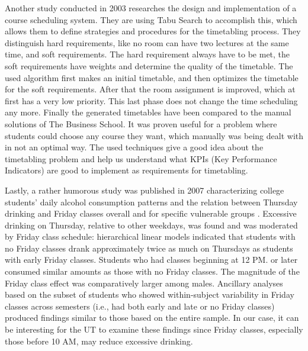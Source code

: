 Another study conducted in 2003 \cite{designAndImplementationOfACourseSchedulingSystem} researches the design and implementation of a course scheduling system. They are using Tabu Search to accomplish this, which allows them to define strategies and procedures for the timetabling process. They distinguish hard requirements, like no room can have two lectures at the same time, and soft requirements. The hard requirement always have to be met, the soft requirements have weights and determine the quality of the timetable. The used algorithm first makes an initial timetable, and then optimizes the timetable for the soft requirements. After that the room assignment is improved, which at first has a very low priority. This last phase does not change the time scheduling any more. Finally the generated timetables have been compared to the manual solutions of The Business School. It was proven useful for a problem where students could choose any course they want, which manually was being dealt with in not an optimal way.
The used techniques give a good idea about the timetabling problem and help us understand what KPIs (Key Performance Indicators) are good to implement as requirements for timetabling.

Lastly, a rather humorous study was published in 2007 characterizing college students’ daily alcohol consumption patterns and the relation between Thursday drinking and Friday classes overall and for specific vulnerable groups \cite{collegeStudentAlcoholConsumption}. Excessive drinking on Thursday, relative to other weekdays, was found and was moderated by Friday class schedule: hierarchical linear models indicated that students with no Friday classes drank approximately twice as much on Thursdays as students with early Friday classes. Students who had classes beginning at 12 PM. or later consumed similar amounts as those with no Friday classes. The magnitude of the Friday class effect was comparatively larger among males. Ancillary analyses based on the subset of students who showed within-subject variability in Friday classes across semesters (i.e., had both early and late or no Friday classes) produced findings similar to those based on the entire sample. In our case, it can be interesting for the UT to examine these findings since Friday classes, especially those before 10 AM, may reduce excessive drinking.
